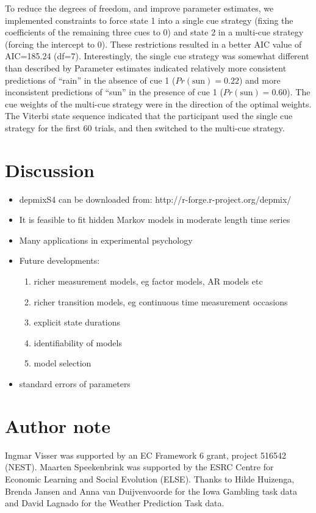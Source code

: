 \documentclass[a4paper,12pt,man]{apa} %
\newcommand{\citet}{\citeA}
\begin{document}
To reduce the degrees of freedom, and improve parameter estimates, we
implemented constraints to force state 1 into a single cue strategy
(fixing the coefficients of the remaining three cues to 0) and state 2
in a multi-cue strategy (forcing the intercept to 0).  These
restrictions resulted in a better AIC value of AIC=185.24 (df=7).
Interestingly, the single cue strategy was somewhat different than
described by \citet{Gluck2002}  Parameter estimates indicated relatively
more consistent predictions of ``rain'' in the absence of cue 1
($Pr(\text{sun}) = 0.22$) and more inconsistent predictions of ``sun''
in the presence of cue 1 ($Pr(\text{sun}) = 0.60$).  The cue weights
of the multi-cue strategy were in the direction of the optimal
weights.  The Viterbi state sequence indicated that the participant
used the single cue strategy for the first 60 trials, and then
switched to the multi-cue strategy.

\section{Discussion}

\begin{itemize}
	\item depmixS4 can be downloaded from: http://r-forge.r-project.org/depmix/
	\item It is feasible to fit hidden Markov models in moderate length time series
	\item Many applications in experimental psychology
	\item Future developments:
	\begin{enumerate}
		\item richer measurement models, eg factor models, AR models etc
		\item richer transition models, eg continuous time measurement occasions
		\item explicit state durations
		\item identifiability of models
		\item model selection
	\end{enumerate}
	\item standard errors of parameters
\end{itemize}

\section*{Author note}

Ingmar Visser was supported by an EC Framework 6 grant, project 516542
(NEST).  Maarten Speekenbrink was supported by the ESRC Centre for
Economic Learning and Social Evolution (ELSE).  Thanks to Hilde
Huizenga, Brenda Jansen and Anna van Duijvenvoorde for the Iowa
Gambling task data and David Lagnado for the Weather Prediction Task
data.




\end{document}

